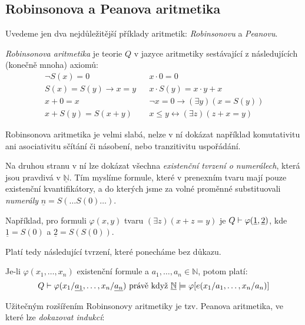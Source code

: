 \subsection{Robinsonova a Peanova aritmetika}

Uvedeme jen dva nejdůležitější příklady aritmetik: \emph{Robinsonovu} a \emph{Peanovu}.

\begin{definition}
\emph{Robinsonova aritmetika} je teorie $Q$ v jazyce aritmetiky sestávající z následujících (konečně mnoha) axiomů:
\begin{align*}
    &\neg S(x) = 0& &x\cdot 0=0\\
    &S(x)=S(y)\rightarrow x=y& &x\cdot S(y)=x\cdot y+x\\
    &x+0=x& &\neg x=0 \rightarrow (\exists y)(x=S(y))\\
    &x+S(y)=S(x+y)& &x\le y \leftrightarrow (\exists z)(z+x=y)\qquad
\end{align*}
\end{definition}

Robinsonova aritmetika je velmi slabá, nelze v ní dokázat například komutativitu ani asociativitu sčítání či násobení, nebo tranzitivitu uspořádání.

Na druhou stranu v ní lze dokázat všechna \emph{existenční tvrzení o numerálech}, která jsou pravdivá v $\underline{\mathbb N}$. Tím myslíme formule, které v prenexním tvaru mají pouze existenční kvantifikátory, a do kterých jsme za volné proměnné substituovali \emph{numerály} $\underline{n}=S(\dots S(0)\dots)$. 

\begin{example}
Například, pro formuli $\varphi(x,y)$ tvaru $(\exists z)(x+z=y)$ je $Q\vdash\varphi(\underline{1},\underline{2})$, kde $\underline{1}=S(0)$ a $\underline{2}=S(S(0))$.    
\end{example}

Platí tedy následující tvrzení, které ponecháme bez důkazu.

\begin{proposition}\label{proposition:robinson-satisfies-existence-about-numerals}
    Je-li $\varphi(x_1,\dots,x_n)$ existenční formule a $a_1,\dots,a_n\in\mathbb N$, potom platí:
    $$
    Q\vdash\varphi(x_1/\underline{a_1},\dots,x_n/\underline{a_n})\text{ právě když }\underline{\mathbb{N}}\models \varphi[e(x_1/a_1,\dots,x_n/a_n)]
    $$
\end{proposition}

Užitečným rozšířením Robinsonovy aritmetiky je tzv. Peanova aritmetika, ve které lze \emph{dokazovat indukcí}:

